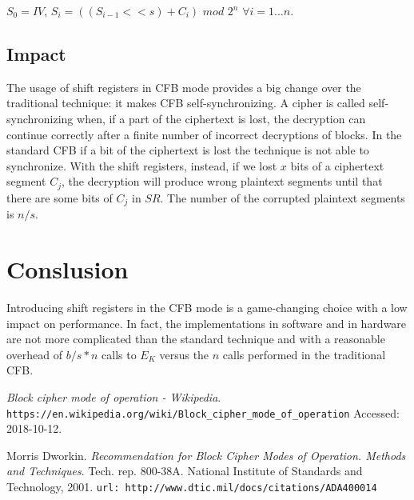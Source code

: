 \documentclass[11pt]{article}
\begin{document}
$S_0 = IV$, $S_i = ((S_{i-1} << s) + C_i)$ $mod$ $2^n$ $\forall i = 1...n$.

\subsection{Impact}

The usage of shift registers in CFB mode provides a big change over the traditional technique: it makes CFB self-synchronizing. A cipher is called self-synchronizing when, if a part of the ciphertext is lost, the decryption can continue correctly after a finite number of incorrect decryptions of blocks.
In the standard CFB if a bit of the ciphertext is lost the technique is not able to synchronize.
With the shift registers, instead, if we lost $x$ bits of a ciphertext segment $C_j$, the decryption will produce wrong plaintext segments until that there are some bits of $C_j$ in $SR$. The number of the corrupted plaintext segments is $n/s$.

\section{Conslusion}

Introducing shift registers in the CFB mode is a game-changing choice with a low impact on performance. In fact, the implementations in software and in hardware are not more complicated than the standard technique and with a reasonable overhead of $b/s * n$ calls to $E_K$ versus the $n$ calls performed in the traditional CFB. 

\vfill

\begin{thebibliography}{99}

{\em Block cipher mode of operation - Wikipedia}.
  \verb|https://en.wikipedia.org/wiki/Block_cipher_mode_of_operation|
  \newblock Accessed: 2018-10-12.

Morris Dworkin.
  {\em Recommendation for Block Cipher Modes of Operation. Methods and Techniques}.
  Tech. rep. 800-38A. National Institute of Standards and Technology, 2001.
  \newblock \verb|url: http://www.dtic.mil/docs/citations/ADA400014|

\end{thebibliography}
\end{document}
